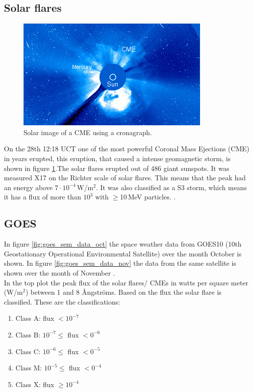 \subsection{Solar flares}
\begin{figure}
\includegraphics[width=.5\textwidth]{figures/SW_CME.jpg}

\caption{Solar image of a CME using a cronagraph\cite{spaceweather}.}
\label{fig:SW:CME}
\end{figure} 

On the 28th 12:18 UCT one of the most powerful Coronal Mass Ejections (CME) in years erupted, this eruption, that caused a intense geomagnetic storm, is shown in figure \ref{fig:SW:CME}.The solar flares erupted out of 486 giant sunspots. It was measured X17  on the Richter scale of solar flares. This means that the peak had an energy above $7 \cdot 10^{-4}$\,W/m$^2$. It was also classified as a S3 storm, which means it has a flux of more than $10^3$ with $\geq$10\,MeV particles.  \cite{spaceweather}.\\


\subsection{GOES}
In figure \ref{fig:goes_sem_data_oct} the space weather data from GOES10 (10th Geostationary Operational Environmental Satellite) over the month October is shown. In figure \ref{fig:goes_sem_data_nov} the data from the same satellite is shown over the month of November \cite{ngdc-noaa}. \\

In the top plot the peak flux of the solar flares/ CMEs in watts per square meter (W/m$^2$) between 1 and 8 Ångströms. Based on the flux the solar flare is classified. These are the classifications:
\begin{enumerate}
	\item Class A: flux $< 10^{-7}$
	\item Class B: $10^{-7} \leq$ flux $< 0^{-6}$
	\item Class C: $10^{-6} \leq$ flux $< 0^{-5}$
	\item Class M: $10^{-5} \leq$ flux $< 0^{-4}$
	\item Class X: flux $\geq 10^{-4}$
\end{enumerate}

